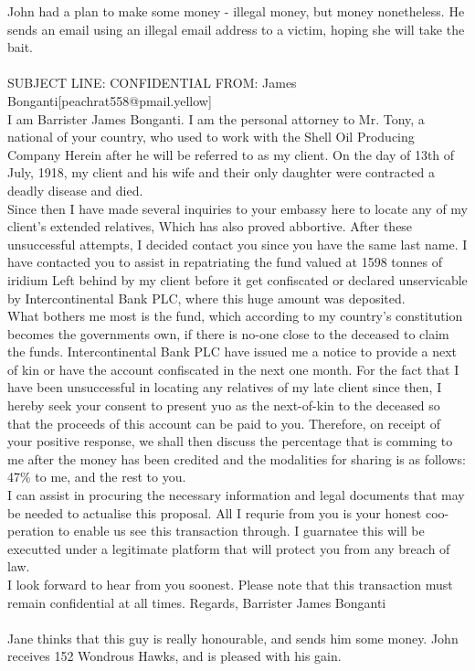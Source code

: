 \documentclass{article}
\begin{document}
John had a plan to make some money {-} illegal money, but money nonetheless.
He sends an email using an illegal email address to a victim, hoping she will take the bait.
\\\\
SUBJECT LINE: CONFIDENTIAL
FROM: James Bonganti[peachrat558@pmail.yellow]
\\
I am Barrister James Bonganti.
I am the personal attorney to Mr. Tony, a national of your country, who used to work with the Shell Oil Producing Company
Herein after he will be referred to as my client.
On the day of 13th of July, 1918, my client and his wife and their only daughter were contracted a deadly disease and died.
\\
Since then I have made several inquiries to your embassy here to locate any of my client's extended relatives, Which has also proved abbortive.
After these unsuccessful attempts, I decided contact you since you have the same last name.
I have contacted you to assist in repatriating the fund valued at 1598 tonnes of iridium Left behind by my client before it get confiscated or declared unservicable by Intercontinental Bank PLC, where this huge amount was deposited.
\\
What bothers me most is the fund, which according to my country's constitution becomes the governments own, if there is no{-}one close to the deceased to claim the funds.
Intercontinental Bank PLC have issued me a notice to provide a next of kin or have the account confiscated in the next one month.
For the fact that I have been unsuccessful in locating any relatives of my late client since then, I hereby seek your consent to present yuo as the next{-}of{-}kin to the deceased so that the proceeds of this account can be paid to you.
Therefore, on receipt of your positive response, we shall then discuss the percentage that is comming to me after the money has been credited and the modalities for sharing is as follows: 47\% to me, and the rest to you.
\\
I can assist in procuring the necessary information and legal documents that may be needed to actualise this proposal.
All I requrie from you is your honest coo{-}peration to enable us see this transaction through.
I guarnatee this will be executted under a legitimate platform that will protect you from any breach of law.
\\
I look forward to hear from you soonest.
Please note that this transaction must remain confidential at all times.
Regards, Barrister James Bonganti
\\\\
Jane thinks that this guy is really honourable, and sends him some money.
John receives 152 Wondrous Hawks, and is pleased with his gain.
\end{document}
